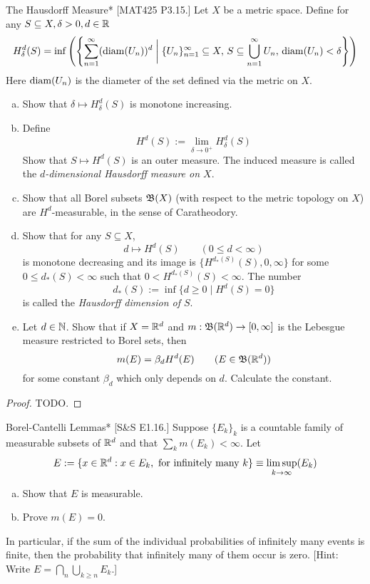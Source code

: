 \begin{problem}{The Hausdorff Measure}*
    [MAT425 P3.15.] Let \(X\) be a metric space. Define for any \(S \subseteq X, \delta > 0, d \in \mathbb{R}\) 
    \[
        H_\delta^d(S) = \inf \left( \left\{ \sum_{n=1}^\infty (\operatorname{diam}(U_n))^d \;\biggr\rvert\; \{U_n\}_{n=1}^\infty \subseteq X, \, S \subseteq \bigcup_{n=1}^\infty U_n, \, \operatorname{diam}(U_n) < \delta \right\} \right)
    \]
    Here \(\operatorname{diam}(U_n)\) is the diameter of the set defined via the metric on \(X\). 
    \begin{enumerate}[(a)]
        \itemsep0em
        \item Show that \(\delta \mapsto H_\delta^d(S)\) is monotone increasing. 
        \item Define 
        \[
            H^d(S) := \lim_{ \delta \to 0^+} H_\delta^d(S)
        \]
        Show that \(S \mapsto H^d(S)\) is an outer measure. The induced measure is called the \emph{\(d\)-dimensional Hausdorff measure on \(X\)}.  
        \item Show that all Borel subsets \(\mathfrak{B}(X)\) (with respect to the metric topology on \(X\)) are \(H^d\)-measurable, in the sense of Caratheodory. 
        \item Show that for any \(S \subseteq X\),
        \[
            d \mapsto H^d(S) \qquad (0 \leq d < \infty)
        \]
        is monotone decreasing and its image is \(\{H^{d_*(S)}(S), 0, \infty\}\) for some \(0 \leq d_*(S) < \infty\) such that \(0 < H^{d_*(S)}(S) < \infty\). The number 
        \[
            d_*(S) := \inf \{ d \geq 0 \mid H^d(S) = 0 \}
        \]
        is called the \emph{Hausdorff dimension of \(S\)}. 
        \item Let \(d \in \mathbb{N}\). Show that if \(X = \mathbb{R}^d\) and \(m : \mathfrak{B}(\mathbb{R}^d) \to [0, \infty]\) is the Lebesgue measure restricted to Borel sets, then 
        \[
            m(E) = \beta_d H^d(E)
            \qquad 
            (E \in \mathfrak{B}(\mathbb{R}^d))
        \]
        for some constant \(\beta_d\) which only depends on \(d\). Calculate the constant. 
    \end{enumerate}
\end{problem}

\begin{proof}
    TODO. 
\end{proof}


\begin{problem}{Borel-Cantelli Lemmas}*
    [S\&S E1.16.] Suppose \(\{E_k\}_k\) is a countable family of measurable subsets of \(\mathbb{R}^d\) and that \(\sum_k m(E_k) < \infty\). Let 
    \[
    E := \{x \in \mathbb{R}^d : x \in E_k, \text{ for infinitely many } k\}
    \equiv \limsup_{k \to \infty} (E_k)
    \]
    \begin{enumerate}[(a)]
        \itemsep0em
        \item Show that \(E\) is measurable. 
        \item Prove \(m(E) = 0\). 
    \end{enumerate}
    In particular, if the sum of the individual probabilities of infinitely many events is finite, then the probability that infinitely many of them occur is zero. [Hint: Write \(E = \bigcap_n \bigcup_{k \geq n} E_k\).]
\end{problem}

